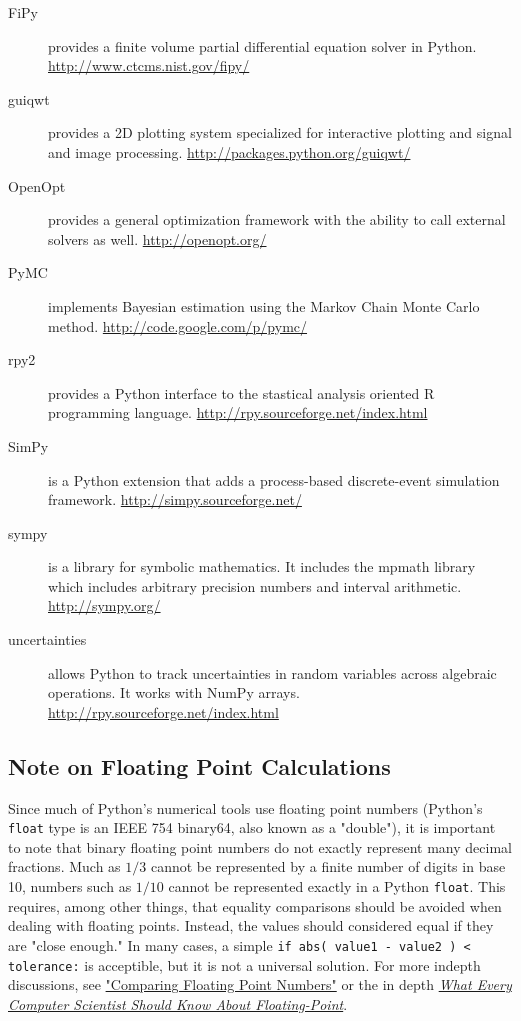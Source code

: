 \begin{description}
	\item[FiPy] provides a finite volume partial differential equation solver in Python. \url{http://www.ctcms.nist.gov/fipy/}
	\item[guiqwt] provides a 2D plotting system specialized for interactive plotting and signal and image processing. \url{http://packages.python.org/guiqwt/}
	\item[OpenOpt] provides a general optimization framework with the ability to call external solvers as well. \url{http://openopt.org/}
	\item[PyMC] implements Bayesian estimation using the Markov Chain Monte Carlo method. \url{http://code.google.com/p/pymc/}
	\item[rpy2] provides a Python interface to the stastical analysis oriented R programming language. \url{http://rpy.sourceforge.net/index.html}
	\item[SimPy] is a Python extension that adds a process-based discrete-event simulation framework. \url{http://simpy.sourceforge.net/}
	\item[sympy] is a library for symbolic mathematics. It includes the mpmath library which includes arbitrary precision numbers and interval arithmetic. \url{http://sympy.org/}
	\item[uncertainties] allows Python to track uncertainties in random variables across algebraic operations. It works with NumPy arrays. \url{http://rpy.sourceforge.net/index.html}
\end{description}


\subsection*{Note on Floating Point Calculations}
Since much of Python's numerical tools use floating point numbers (Python's \verb|float| type is an IEEE 754 binary64, also known as a "double"), it is important to note that binary floating point numbers do not exactly represent many decimal fractions. Much as $1/3$ cannot be represented by a finite number of digits in base 10, numbers such as $1/10$ cannot be represented exactly in a Python \verb|float|. This requires, among other things, that equality comparisons should be avoided when dealing with floating points. Instead, the values should considered equal if they are "close enough." In many cases, a simple \verb|if abs( value1 - value2 ) < tolerance:| is acceptible, but it is not a universal solution. For more indepth discussions, see \href{http://www.cygnus-software.com/papers/comparingfloats/comparingfloats.htm}{"Comparing Floating Point Numbers"}  or the in depth \href{http://www.cse.msu.edu/~cse320/Documents/FloatingPoint.pdf}{\emph{What Every Computer Scientist Should Know About Floating-Point}}.

